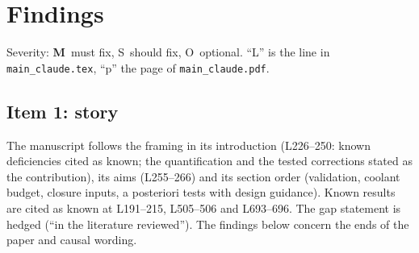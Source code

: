 \documentclass[10pt]{article}
\newcommand{\M}{\textbf{M}}
\newcommand{\Sf}{S}
\newcommand{\Op}{O}
\begin{document}
\newpage
\section{Findings}\label{sec:findings}

Severity: \M\ must fix, \Sf\ should fix, \Op\ optional. ``L'' is the line in \texttt{main\_claude.tex}, ``p'' the
page of \texttt{main\_claude.pdf}.

\subsection{Item 1: story}

The manuscript follows the framing in its introduction (L226--250: known deficiencies cited as known; the
quantification and the tested corrections stated as the contribution), its aims (L255--266) and its section order
(validation, coolant budget, closure inputs, a posteriori tests with design guidance). Known results are cited as
known at L191--215, L505--506 and L693--696. The gap statement is hedged (``in the literature reviewed''). The
findings below concern the ends of the paper and causal wording.
\end{document}
